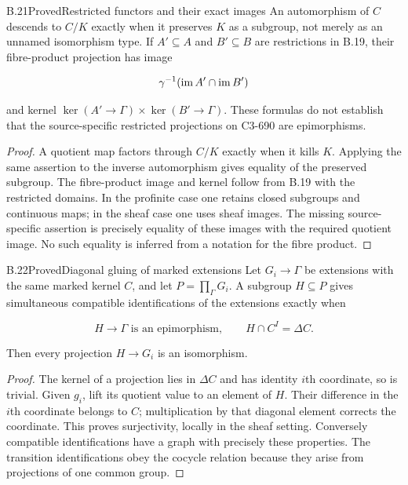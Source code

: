 \begin{statement}{B.21}{Proved}{Restricted functors and their exact images}
An automorphism of $C$ descends to $C/K$ exactly when it
preserves $K$ as a subgroup, not merely as an unnamed
isomorphism type. If $A'\subseteq A$ and $B'\subseteq B$
are restrictions in B.19, their fibre-product projection
has image

$$
\gamma^{-1}(\operatorname{im} A'\cap\operatorname{im} B')
$$

and kernel $\ker(A'\to\Gamma)\times\ker(B'\to\Gamma)$.
These formulas do not establish that the source-specific
restricted projections on C3-690 are epimorphisms.
\end{statement}
\begin{proof}
A quotient map factors through $C/K$ exactly when it kills
$K$. Applying the same assertion to the inverse automorphism
gives equality of the preserved subgroup.
The fibre-product image and kernel follow from B.19 with
the restricted domains. In the profinite case one retains
closed subgroups and continuous maps; in the sheaf case one
uses sheaf images. The missing source-specific assertion
is precisely equality of these images with the required
quotient image. No such equality is inferred from a notation
for the fibre product.
\end{proof}

\begin{statement}{B.22}{Proved}{Diagonal gluing of marked extensions}
Let $G_i\to\Gamma$ be extensions with the same marked kernel
$C$, and let $P=\prod_\Gamma G_i$.
A subgroup $H\subseteq P$ gives simultaneous compatible
identifications of the extensions exactly when

$$
H\to\Gamma\text{ is an epimorphism},\qquad
 H\cap C^I=\Delta C.
$$

Then every projection $H\to G_i$ is an isomorphism.
\end{statement}
\begin{proof}
The kernel of a projection lies in $\Delta C$ and has
identity $i$th coordinate, so is trivial.
Given $g_i$, lift its quotient value to an element of $H$.
Their difference in the $i$th coordinate belongs to $C$;
multiplication by that diagonal element corrects the
coordinate. This proves surjectivity, locally in the
sheaf setting. Conversely compatible identifications have
a graph with precisely these properties.
The transition identifications obey the cocycle relation
because they arise from projections of one common group.
\end{proof}

